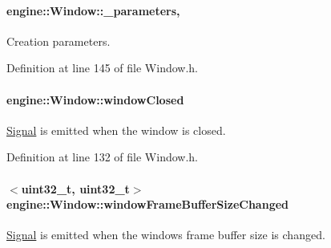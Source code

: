 \paragraph[{\texorpdfstring{\+\_\+parameters}{_parameters}}]{ engine\+::\+Window\+::\+\_\+parameters\hspace{0.3cm}{\ttfamily [protected]}, {\ttfamily [inherited]}}\hypertarget{a00082_aae1d39f3df529497025772967ac578a0}{}\label{a00082_aae1d39f3df529497025772967ac578a0}
Creation parameters. 

Definition at line 145 of file Window.\+h.

\paragraph[{\texorpdfstring{window\+Closed}{windowClosed}}]{ engine\+::\+Window\+::window\+Closed\hspace{0.3cm}{\ttfamily [inherited]}}\hypertarget{a00082_a5bb494c228eb398d6893327fcf03d2d3}{}\label{a00082_a5bb494c228eb398d6893327fcf03d2d3}
\hyperlink{a00065}{Signal} is emitted when the window is closed. 

Definition at line 132 of file Window.\+h.

\paragraph[{\texorpdfstring{window\+Frame\+Buffer\+Size\+Changed}{windowFrameBufferSizeChanged}}]{$<$uint32\+\_\+t, uint32\+\_\+t$>$ engine\+::\+Window\+::window\+Frame\+Buffer\+Size\+Changed\hspace{0.3cm}{\ttfamily [inherited]}}\hypertarget{a00082_a0c6ef7abcac1063c91a84123c81f9347}{}\label{a00082_a0c6ef7abcac1063c91a84123c81f9347}
\hyperlink{a00065}{Signal} is emitted when the window\textquotesingle{}s frame buffer size is changed. 

